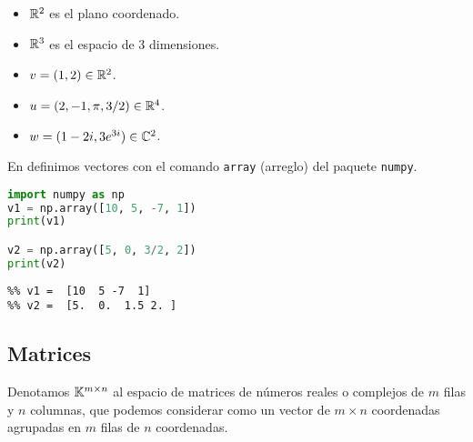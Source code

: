 \begin{ejemplo}\leavevmode
\begin{itemize}
\item   $\mathbb R^2$ es el plano coordenado.
\item   $\mathbb R^3$ es el espacio de 3 dimensiones.
\end{itemize}
\end{ejemplo}

\begin{ejemplo}\leavevmode
\begin{itemize}
\item $\vb = (1,2) \in \mathbb{R}^2$.
\item $\ub = (2, -1, \pi, 3/2) \in \mathbb{R}^4$.
\item $\wb = (1-2i,3e^{3i})\in \C^2 $.
\end{itemize}
\end{ejemplo}

En \python definimos vectores con el comando \texttt{array} (arreglo) del paquete \texttt{numpy}.

\begin{Shaded}
\begin{lstlisting}[language=python]
import numpy as np
v1 = np.array([10, 5, -7, 1])
print(v1)

v2 = np.array([5, 0, 3/2, 2])
print(v2)
\end{lstlisting}
\end{Shaded}

\begin{verbatim}
%% v1 =  [10  5 -7  1]
%% v2 =  [5.  0.  1.5 2. ]
\end{verbatim}

\subsection{Matrices}

Denotamos $\mathbb K^{m \times n}$ al espacio de matrices de números reales o complejos de $m$ filas y $n$ columnas, que podemos considerar como un vector de $m \times n$ coordenadas agrupadas en $m$ filas de $n$ coordenadas.

